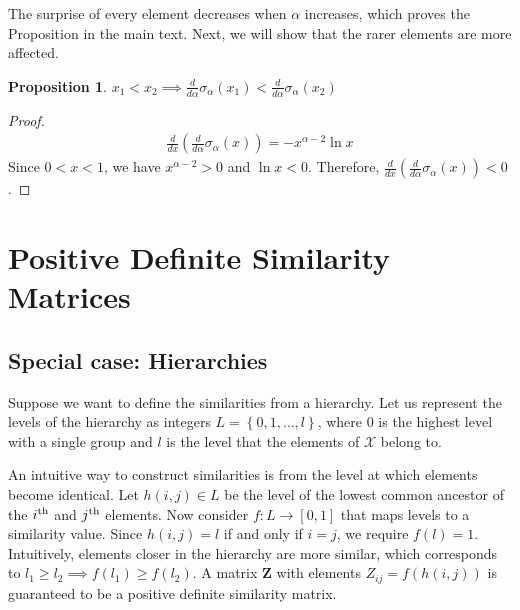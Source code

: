 \documentclass[aps,pre,floats,floatfix,superscriptaddress,twocolumn,final,10pt]{revtex4-2}
\theoremstyle{definition}
\newtheorem{proposition}{Proposition}
\renewcommand{\vec}[1]{\mathbf{#1}}
\begin{document}
The surprise of every element decreases when $\alpha$ increases, which proves the Proposition in the main text. Next, we will show that the rarer elements are more affected.

\begin{proposition}
    $x_1 < x_2 \implies \frac{d}{d\alpha} \sigma_\alpha(x_1) < \frac{d}{d\alpha} \sigma_\alpha(x_2)$
\end{proposition}
\begin{proof}
    \begin{align*}
        \frac{d}{dx} \left( \frac{d}{d\alpha} \sigma_\alpha(x) \right) = -x^{\alpha-2} \ln x
    \end{align*}
    Since $0<x<1$, we have $x^{\alpha-2} >0$ and $\ln x<0$. Therefore, $\frac{d}{dx} \left( \frac{d}{d\alpha} \sigma_\alpha(x) \right) < 0$.
\end{proof}


\section{Positive Definite Similarity Matrices}
\subsection{Special case: Hierarchies}
Suppose we want to define the similarities from a hierarchy. Let us represent the levels of the hierarchy as integers $L =\left\{ 0,1,\dots,l\right\}$, where $0$ is the highest level with a single group and $l$ is the level that the elements of $\mathcal{X}$ belong to. 

An intuitive way to construct similarities is from the level at which elements become identical. Let $h(i,j) \in L$ be the level of the lowest common ancestor of the $i^\textnormal{th}$ and $j^\textnormal{th}$ elements. Now consider $f:L\to\left[0,1\right]$ that maps levels to a similarity value. Since $h(i,j)=l$ if and only if $i=j$, we require $f(l)=1$. Intuitively, elements closer in the hierarchy are more similar, which corresponds to $l_1\geq l_2 \implies f(l_1)\geq f(l_2)$. A matrix $\vec{Z}$ with elements $Z_{ij}=f\left(h(i,j)\right)$ is guaranteed to be a positive definite similarity matrix.
\end{document}
